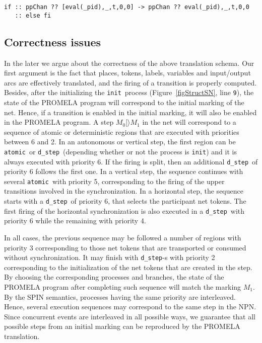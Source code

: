 \documentclass{llncs}
\begin{document}
\small
\begin{verbatim}
if :: ppChan ?? [eval(_pid),_,t,0,0] -> ppChan ?? eval(_pid),_,t,0,0
   :: else fi
\end{verbatim}
\nfont




\subsection{Correctness issues}

In the later we argue about the correctness of the above translation schema. Our first argument is the fact that places, tokens, labels, variables and input/output arcs are effectively translated, and the firing of a transition is properly computed. Besides, after the initializing the \small\verb"init"\nfont\  process (Figure~\ref{figStructSN}, line \small\verb"9"\nfont), the state of the PROMELA program will correspond to the initial marking of the net.  Hence, if a transition is enabled in the initial marking, it will also be enabled in the PROMELA program.  A step $M_0[\rangle M_1$ in the net will correspond to a sequence of atomic or deterministic regions that are executed with priorities between 6 and 2. In an autonomous or vertical step, the first region can be \small\verb"atomic"\nfont\  or \small\verb"d_step"\nfont\ (depending whether or not the process is \small\verb"init"\nfont) and it is always executed with priority 6. If the firing is split, then an additional \small\verb"d_step"\nfont\   of priority 6 follows the first one. In a vertical step, the sequence continues with several \small\verb"atomic"\nfont\  with priority 5, corresponding to the firing of the upper transitions involved in the synchronization. In a horizontal step, the sequence starts with a \small\verb"d_step"\nfont\  of priority 6, that selects the participant net tokens. The first firing of the horizontal synchronization is also executed in a \small\verb"d_step"\nfont\   with priority 6 while the remaining with priority 4.

In all cases, the previous sequence may be followed a number of regions with priority 3 corresponding to those net tokens that are transported or consumed without synchronization. It may finish with \small\verb"d_step"\nfont-s  with priority 2 corresponding to the initialization of the net tokens that are created in the step. By choosing the corresponding processes and branches, the state of the PROMELA program after completing such sequence will match the marking $M_1$. By the SPIN  semantics, processes having the same priority are interleaved. Hence, several execution sequences may correspond to the same step in the NPN. Since concurrent events are interleaved in all possible ways, we guarantee that all possible steps from an initial marking can be reproduced by the PROMELA translation.
\end{document}
